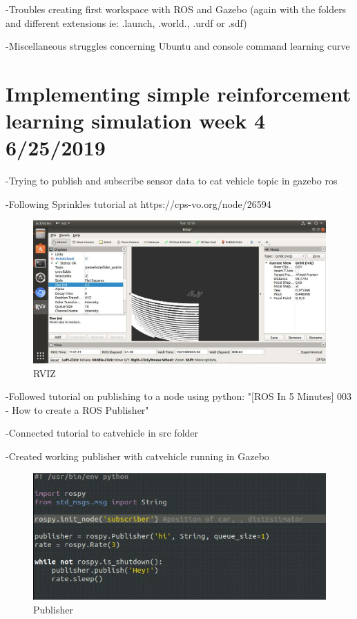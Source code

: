 \documentclass[12pt]{article}
\begin{document}
-Troubles creating first workspace with ROS and Gazebo (again with the folders and different extensions ie: .launch, .world., .urdf or .sdf)

-Miscellaneous struggles concerning Ubuntu and console command learning curve 

\section{Implementing simple reinforcement learning simulation week 4 6/25/2019}

-Trying to publish and subscribe sensor data to cat vehicle topic in gazebo ros

-Following Sprinkles tutorial at https://cps-vo.org/node/26594

\begin{figure}[h]
\begin{center}
	\includegraphics[scale=.3]{rviz1.JPG}
	\caption{RVIZ}
\end{center}
\end{figure}

-Followed tutorial on publishing to a node using python: 
"[ROS In 5 Minutes] 003 - How to create a ROS Publisher"

-Connected tutorial to catvehicle in src folder

-Created working publisher with catvehicle running in Gazebo

\begin{figure}[h]
\begin{center}
	\includegraphics[scale=.6]{publisher1.JPG}
	\caption{Publisher}
\end{center}
\end{figure}
\end{document}
